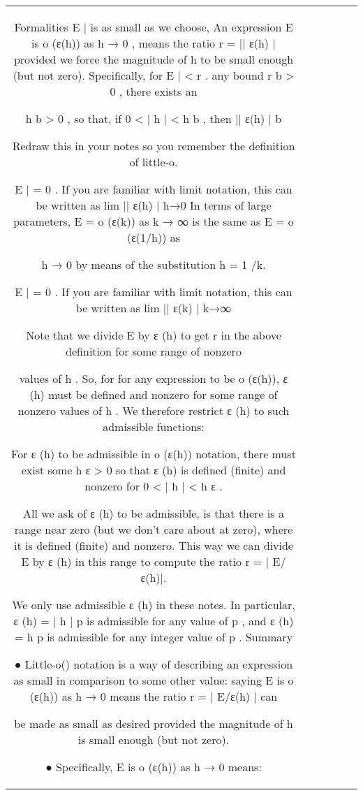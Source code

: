 \begin{table}
\begin{tabular}{|S[table-format=2.6]|S[table-format=1.8]|S[table-format=1.8]|S[table-format=7]|S[table-format=10]|S[table-format=1.5]|}
Formalities
E | is as small as we choose,  
An expression  E    is  o (ε(h))  as  h → 0 , means the ratio  r = || ε(h)
|
provided we force the magnitude of  h to be small enough (but not zero).  Specifically, for  
E | < r .  
any bound   r b > 0 ,  there exists an 
 
h b > 0 ,  so that, if  0 < | h | < h b ,  then  || ε(h)
| b
 
 
 
 
Redraw this in your notes so you remember the definition of little-o. 
 
 
E | = 0 .  
If you are familiar with limit notation, this can be written as  lim || ε(h)
|
h→0
 In terms of large parameters,  E = o (ε(k))    as  k → ∞   is the same as  E = o (ε(1/h))  as
   
h → 0 by means of the substitution  h = 1 /k.  
 
E | = 0 .  
If you are familiar with limit notation, this can be written as  lim || ε(k)
|
k→∞
 
Note that we divide  E  by 
  ε (h)  to get  r  in the above definition for some range of nonzero
 
 
values of  h .    So, for for any expression to be  o (ε(h)),   ε (h)  must be defined and nonzero  
for some range of nonzero values of  h .    We therefore restrict  ε (h)  to such admissible  
functions:   
 
For  ε (h)  to be admissible in  o (ε(h))  notation, there must exist some  h ε > 0  so  
that  ε (h)  is defined (finite) and nonzero for  0 < | h | < h ε .     
 
 
All we ask of  ε (h)  to be admissible, is that there is a range near zero (but we don’t  
care about at zero), where it is defined (finite) and nonzero.  This way we can 
divide  E    by  ε (h)  in this range to compute the ratio  r = | E/ε(h)|.  
 
 We only use admissible   ε (h)  in these notes.  In particular,  ε (h) = | h | p  is admissible for  
any value of  p ,  and   ε (h) = h p  is admissible for any integer value of  p .  
Summary
 
●
Little-o() notation is a way of describing an expression as small in comparison to 
some other value: saying  E  is 
  o (ε(h))  as  h → 0  means the ratio  r = | E/ε(h) |  can
 
 be made as small as desired provided the magnitude of  h is small enough (but  
not zero). 
 
●
Specifically,  E    is  o (ε(h))  as  h → 0  means:  
 

\end{tabular}
\end{table}

